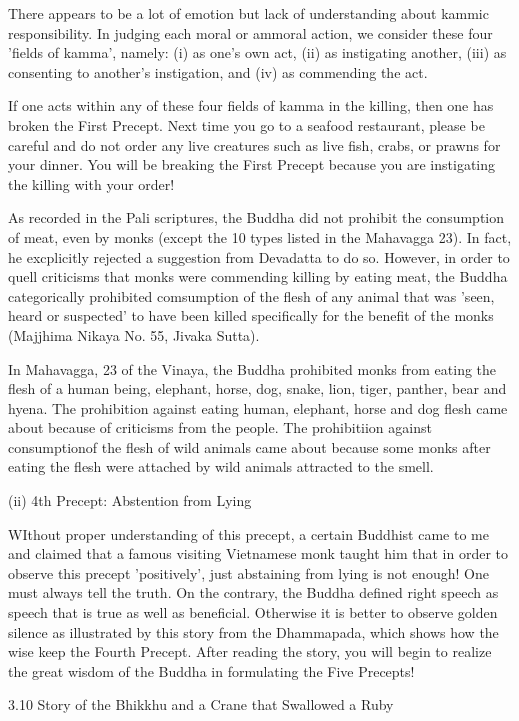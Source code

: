 There appears to be a lot of emotion but lack of understanding about kammic responsibility. In judging each moral or ammoral action, we consider these four 'fields of kamma', namely: (i) as one's own act, (ii) as instigating another, (iii) as consenting to another's instigation, and (iv) as commending the act.

If one acts within any of these four fields of kamma in the killing, then one has broken the First Precept. Next time you go to a seafood restaurant, please be careful and do not order any live creatures such as live fish, crabs, or prawns for your dinner. You will be breaking the First Precept because you are instigating the killing with your order!

As recorded in the Pali scriptures, the Buddha did not prohibit the consumption of meat, even by monks (except the 10 types listed in the Mahavagga 23). In fact, he excplicitly rejected a suggestion from Devadatta to do so. However, in order to quell criticisms that monks were commending killing by eating meat, the Buddha categorically prohibited comsumption of the flesh of any animal that was 'seen, heard or suspected' to have been killed specifically for the benefit of the monks (Majjhima Nikaya No. 55, Jivaka Sutta).

In Mahavagga, 23 of the Vinaya, the Buddha prohibited monks from eating the flesh of a human being, elephant, horse, dog, snake, lion, tiger, panther, bear and hyena. The prohibition against eating human, elephant, horse and dog flesh came about because of criticisms from the people. The prohibitiion against consumptionof the flesh of wild animals came about because some monks after eating the flesh were attached by wild animals attracted to the smell.

(ii) 4th Precept: Abstention from Lying

WIthout proper understanding of this precept, a certain Buddhist came to me and claimed that a famous visiting Vietnamese monk taught him that in order to observe this precept 'positively', just abstaining from lying is not enough! One must always tell the truth. On the contrary, the Buddha defined right speech as speech that is true as well as beneficial. Otherwise it is better to observe golden silence as illustrated by this story from the Dhammapada, which shows how the wise keep the Fourth Precept. After reading the story, you will begin to realize the great wisdom of the Buddha in formulating the Five Precepts!

3.10 Story of the Bhikkhu and a Crane that Swallowed a Ruby

